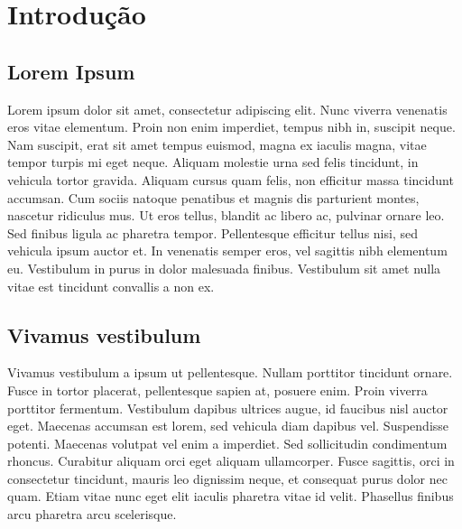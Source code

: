 \chapter{Introdução}

\section{Lorem Ipsum}

Lorem ipsum dolor sit amet, consectetur adipiscing elit. Nunc viverra venenatis eros vitae elementum. Proin non enim imperdiet, tempus nibh in, suscipit neque. Nam suscipit, erat sit amet tempus euismod, magna ex iaculis magna, vitae tempor turpis mi eget neque. Aliquam molestie urna sed felis tincidunt, in vehicula tortor gravida. Aliquam cursus quam felis, non efficitur massa tincidunt accumsan. Cum sociis natoque penatibus et magnis dis parturient montes, nascetur ridiculus mus. Ut eros tellus, blandit ac libero ac, pulvinar ornare leo. Sed finibus ligula ac pharetra tempor. Pellentesque efficitur tellus nisi, sed vehicula ipsum auctor et. In venenatis semper eros, vel sagittis nibh elementum eu. Vestibulum in purus in dolor malesuada finibus. Vestibulum sit amet nulla vitae est tincidunt convallis a non ex.

\section{Vivamus vestibulum }

Vivamus vestibulum a ipsum ut pellentesque. Nullam porttitor tincidunt ornare. Fusce in tortor placerat, pellentesque sapien at, posuere enim. Proin viverra porttitor fermentum. Vestibulum dapibus ultrices augue, id faucibus nisl auctor eget. Maecenas accumsan est lorem, sed vehicula diam dapibus vel. Suspendisse potenti. Maecenas volutpat vel enim a imperdiet. Sed sollicitudin condimentum rhoncus. Curabitur aliquam orci eget aliquam ullamcorper. Fusce sagittis, orci in consectetur tincidunt, mauris leo dignissim neque, et consequat purus dolor nec quam. Etiam vitae nunc eget elit iaculis pharetra vitae id velit. Phasellus finibus arcu pharetra arcu scelerisque.



